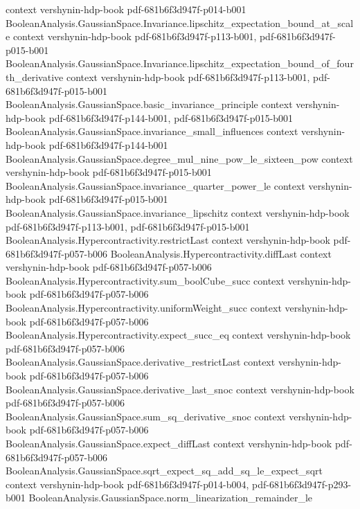 \begin{theorem}
  {context}
  {vershynin-hdp-book}
  {pdf-681b6f3d947f-p014-b001}
\proofstep
  {BooleanAnalysis.GaussianSpace.Invariance.lipschitz_expectation_bound_at_scale}
  {context}
  {vershynin-hdp-book}
  {pdf-681b6f3d947f-p113-b001,
    pdf-681b6f3d947f-p015-b001}
\proofstep
  {BooleanAnalysis.GaussianSpace.Invariance.lipschitz_expectation_bound_of_fourth_derivative}
  {context}
  {vershynin-hdp-book}
  {pdf-681b6f3d947f-p113-b001,
    pdf-681b6f3d947f-p015-b001}
\proofstep
  {BooleanAnalysis.GaussianSpace.basic_invariance_principle}
  {context}
  {vershynin-hdp-book}
  {pdf-681b6f3d947f-p144-b001,
    pdf-681b6f3d947f-p015-b001}
\proofstep
  {BooleanAnalysis.GaussianSpace.invariance_small_influences}
  {context}
  {vershynin-hdp-book}
  {pdf-681b6f3d947f-p144-b001}
\proofstep
  {BooleanAnalysis.GaussianSpace.degree_mul_nine_pow_le_sixteen_pow}
  {context}
  {vershynin-hdp-book}
  {pdf-681b6f3d947f-p015-b001}
\proofstep
  {BooleanAnalysis.GaussianSpace.invariance_quarter_power_le}
  {context}
  {vershynin-hdp-book}
  {pdf-681b6f3d947f-p015-b001}
\proofstep
  {BooleanAnalysis.GaussianSpace.invariance_lipschitz}
  {context}
  {vershynin-hdp-book}
  {pdf-681b6f3d947f-p113-b001,
    pdf-681b6f3d947f-p015-b001}
\proofstep
  {BooleanAnalysis.Hypercontractivity.restrictLast}
  {context}
  {vershynin-hdp-book}
  {pdf-681b6f3d947f-p057-b006}
\proofstep
  {BooleanAnalysis.Hypercontractivity.diffLast}
  {context}
  {vershynin-hdp-book}
  {pdf-681b6f3d947f-p057-b006}
\proofstep
  {BooleanAnalysis.Hypercontractivity.sum_boolCube_succ}
  {context}
  {vershynin-hdp-book}
  {pdf-681b6f3d947f-p057-b006}
\proofstep
  {BooleanAnalysis.Hypercontractivity.uniformWeight_succ}
  {context}
  {vershynin-hdp-book}
  {pdf-681b6f3d947f-p057-b006}
\proofstep
  {BooleanAnalysis.Hypercontractivity.expect_succ_eq}
  {context}
  {vershynin-hdp-book}
  {pdf-681b6f3d947f-p057-b006}
\proofstep
  {BooleanAnalysis.GaussianSpace.derivative_restrictLast}
  {context}
  {vershynin-hdp-book}
  {pdf-681b6f3d947f-p057-b006}
\proofstep
  {BooleanAnalysis.GaussianSpace.derivative_last_snoc}
  {context}
  {vershynin-hdp-book}
  {pdf-681b6f3d947f-p057-b006}
\proofstep
  {BooleanAnalysis.GaussianSpace.sum_sq_derivative_snoc}
  {context}
  {vershynin-hdp-book}
  {pdf-681b6f3d947f-p057-b006}
\proofstep
  {BooleanAnalysis.GaussianSpace.expect_diffLast}
  {context}
  {vershynin-hdp-book}
  {pdf-681b6f3d947f-p057-b006}
\proofstep
  {BooleanAnalysis.GaussianSpace.sqrt_expect_sq_add_sq_le_expect_sqrt}
  {context}
  {vershynin-hdp-book}
  {pdf-681b6f3d947f-p014-b004,
    pdf-681b6f3d947f-p293-b001}
\proofstep
  {BooleanAnalysis.GaussianSpace.norm_linearization_remainder_le}

\end{theorem}
